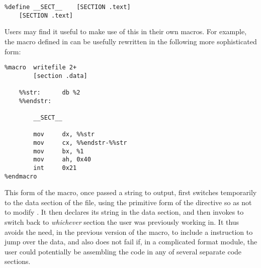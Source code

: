 \begin{lstlisting}
%define __SECT__    [SECTION .text]
    [SECTION .text]
\end{lstlisting}

Users may find it useful to make use of this in their own macros.
For example, the  macro defined in 
can be usefully rewritten in the following more sophisticated form:

\begin{lstlisting}
%macro  writefile 2+
        [section .data]

    %%str:      db %2
    %%endstr:

        __SECT__

        mov     dx, %%str
        mov     cx, %%endstr-%%str
        mov     bx, %1
        mov     ah, 0x40
        int     0x21
%endmacro
\end{lstlisting}

This form of the macro, once passed a string to output, first
switches temporarily to the data section of the file, using the
primitive form of the  directive so as not to modify
. It then declares its string in the data section,
and then invokes  to switch back to \emph{whichever}
section the user was previously working in. It thus avoids the need,
in the previous version of the macro, to include a  instruction
to jump over the data, and also does not fail if, in a complicated
 format module, the user could potentially be assembling the
code in any of several separate code sections.
